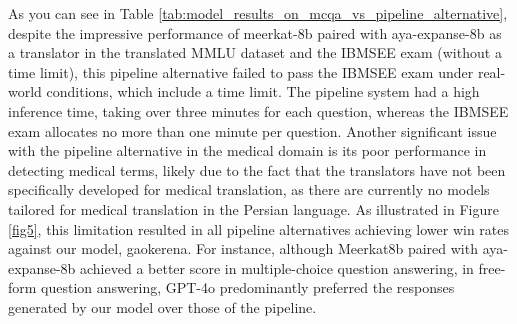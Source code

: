 \documentclass[conference]{IEEEtran}
\begin{document}
As you can see in Table
 \ref{tab:model_results_on_mcqa_vs_pipeline_alternative},
despite the impressive performance of meerkat-8b
\cite{b8}
paired with aya-expanse-8b as a translator in the translated MMLU dataset and the IBMSEE exam (without a time limit), this pipeline alternative failed to pass the IBMSEE exam under real-world conditions, which include a time limit. The pipeline system had a high inference time, taking over three minutes for each question, whereas the IBMSEE exam allocates no more than one minute per question. Another significant issue with the pipeline alternative in the medical domain is its poor performance in detecting medical terms, likely due to the fact that the translators have not been specifically developed for medical translation, as there are currently no models tailored for medical translation in the Persian language. As illustrated in Figure \ref{fig5}, this limitation resulted in all pipeline alternatives achieving lower win rates against our model, gaokerena. For instance, although Meerkat8b paired with aya-expanse-8b achieved a better score in multiple-choice question answering, in free-form question answering, GPT-4o predominantly preferred the responses generated by our model over those of the pipeline.
\end{document}

